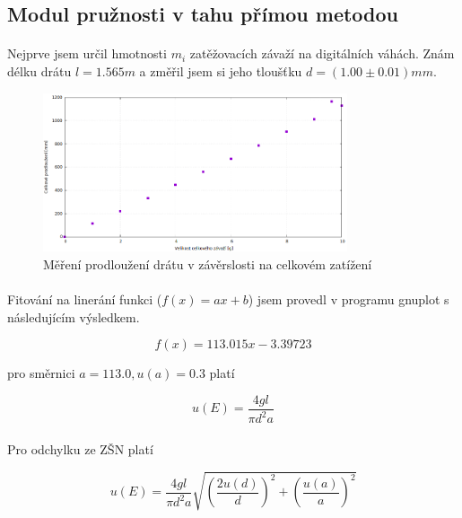 \documentclass[a4paper,11pt]{article}
\begin{document}
    \subsection{Modul pružnosti v tahu přímou metodou}

        \paragraph{} Nejprve jsem určil hmotnosti $m_{i}$ zatěžovacích závaží na digitálních váhách.
        Znám délku drátu $l = 1.565m$ a změřil jsem si jeho tloušťku $d = (1.00 \pm 0.01) mm$. 

        \begin{figure}[h]
            \centering
            \includegraphics[width=0.8\textwidth]{mereni1.png}
            \caption{Měření prodloužení drátu v závěrslosti na celkovém zatížení}
            \label{fig:mereni1}
        \end{figure}

        \paragraph{} Fitování na linerání funkci ($f(x) = ax + b$) jsem provedl v 
        programu gnuplot s následujícím výsledkem.

        $$f(x) = 113.015x - 3.39723$$

        pro směrnici $a = 113.0, u(a) = 0.3$ platí

        \begin{equation}
            u(E) = \frac{4 g l}{\pi d^{2} a}
        \end{equation}

        \paragraph{} Pro odchylku ze ZŠN platí

        \begin{equation}
            u(E) = \frac{4 g l}{\pi d^{2} a} \sqrt{\left( \frac{2u(d)}{d} \right) ^{2} 
                + \left( \frac{u(a)}{a} \right) ^{2}}
        \end{equation}
\end{document}
